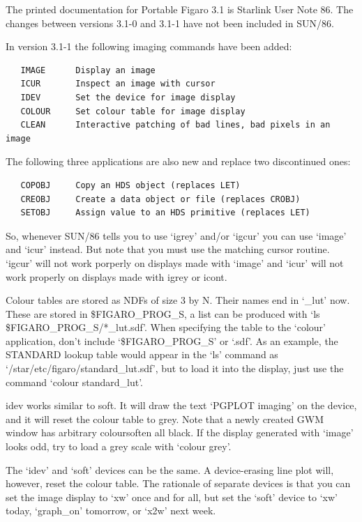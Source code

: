    The printed documentation for Portable Figaro 3.1 is Starlink User
   Note 86. The changes between versions 3.1-0 and 3.1-1 have not been
   included in SUN/86.

   In version 3.1-1 the following imaging commands have been added:

\begin{verbatim}
   IMAGE      Display an image
   ICUR       Inspect an image with cursor
   IDEV       Set the device for image display
   COLOUR     Set colour table for image display
   CLEAN      Interactive patching of bad lines, bad pixels in an image
\end{verbatim}

   The following three applications are also new and replace two
   discontinued ones:

\begin{verbatim}
   COPOBJ     Copy an HDS object (replaces LET)
   CREOBJ     Create a data object or file (replaces CROBJ)
   SETOBJ     Assign value to an HDS primitive (replaces LET)
\end{verbatim}

   So, whenever SUN/86 tells you to use `igrey' and/or `igcur' you can
   use `image' and `icur' instead. But note that you must use the
   matching cursor routine. `igcur' will not work porperly on displays
   made with `image' and `icur' will not work properly on displays made
   with igrey or icont.

   Colour tables are stored as NDFs of size 3 by N. Their names end in
   `\_lut' now. These are stored in \$FIGARO\_PROG\_S, a list can be
   produced with `ls \$FIGARO\_PROG\_S/*\_lut.sdf'. When specifying the
   table to the `colour' application, don't include `\$FIGARO\_PROG\_S' or
   `.sdf'. As an example, the STANDARD lookup table would appear in the
   `ls' command as `/star/etc/figaro/standard\_lut.sdf', but to load it
   into the display, just use the command `colour standard\_lut'.

   idev works similar to soft. It will draw the text `PGPLOT imaging' on
   the device, and it will reset the colour table to grey. Note that a
   newly created GWM window has arbitrary colours\latorhtm{---}{-}often all
   black. If
   the display generated with `image' looks odd, try to load a grey
   scale with `colour grey'.

   The `idev' and `soft' devices can be the same. A device-erasing line
   plot will, however, reset the colour table. The rationale of separate
   devices is that you can set the image display to `xw' once and for
   all, but set the `soft' device to `xw' today, `graph\_on' tomorrow, or
   `x2w' next week.

